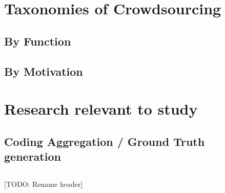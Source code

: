\section{Taxonomies of Crowdsourcing}\label{taxonomies-of-crowdsourcing}

\subsection{By Function}\label{by-function}

\subsection{By Motivation}\label{by-motivation}

\section{Research relevant to study}\label{research-relevant-to-study}

\subsection{Coding Aggregation / Ground Truth
generation}\label{coding-aggregation-ground-truth-generation}

\subsection{}\label{section}

{[}TODO: Rename header{]}
